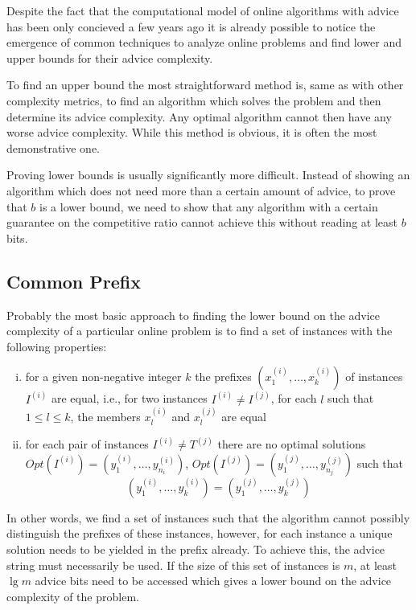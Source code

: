 Despite the fact that the computational model of online algorithms with
advice has been only concieved a few years ago it is already possible to
notice the emergence of common techniques to analyze online problems and
find lower and upper bounds for their advice complexity.

To find an upper bound the most straightforward method is, same as with
other complexity metrics, to find an algorithm which solves the problem
and then determine its advice complexity. Any optimal algorithm cannot
then have any worse advice complexity. While this method is obvious, it is
often the most demonstrative one.

Proving lower bounds is usually significantly more difficult. Instead of
showing an algorithm which does not need more than a certain amount of
advice, to prove that $b$ is a lower bound, we need to show that any
algorithm with a certain guarantee on the competitive ratio cannot achieve
this without reading at least $b$ bits.

\subsection{Common Prefix}

Probably the most basic approach to finding the lower bound on the advice
complexity of a particular online problem is to find a set of instances
with the following properties:

\begin{enumerate}[(i)]
    \item
    for a given non-negative integer $k$ the prefixes $(x_1^{(i)}, \dots,
    x_k^{(i)})$ of instances $I^{(i)}$ are equal, i.e., for two instances
    $I^{(i)} \not= I^{(j)}$, for each $l$ such that $1 \leq l \leq k$,
    the members $x_l^{(i)}$ and $x_l^{(j)}$ are equal

    \item
    for each pair of instances $I^{(i)} \not= T^{(j)}$ there are no
    optimal solutions $Opt(I^{(i)}) = (y_1^{(i)}, \dots, y_{n_i}^{(i)})$,
    $Opt(I^{(j)}) = (y_1^{(j)}, \dots, y_{n_j}^{(j)})$ such that
    $$
        (y_1^{(i)}, \dots, y_{k}^{(i)}) = (y_1^{(j)}, \dots, y_{k}^{(j)})
    $$
\end{enumerate}

In other words, we find a set of instances such that the algorithm cannot
possibly distinguish the prefixes of these instances, however, for each
instance a unique solution needs to be yielded in the prefix already. To
achieve this, the advice string must necessarily be used. If the size of
this set of instances is $m$, at least $\lg m$ advice bits need to be
accessed which gives a lower bound on the advice complexity of the
problem.

